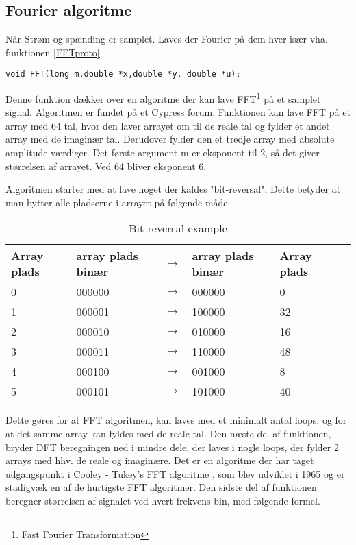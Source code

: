 
\subsection{Fourier algoritme}
Når Strøm og spænding er samplet. Laves der Fourier på dem hver især vha. funktionen \ref{FFTproto}

\begin{lstlisting}
void FFT(long m,double *x,double *y, double *u);
\end{lstlisting}

Denne funktion dækker over en algoritme der kan lave FFT\footnote{Fast Fourier Transformation} på et samplet signal. Algoritmen er fundet på et Cypress forum\cite{FFTalgo}. Funktionen kan lave FFT på et array med 64 tal, hvor den laver arrayet om til de reale tal og fylder et andet array med de imaginær tal. Derudover fylder den et tredje array med absolute amplitude værdiger. Det første argument m er eksponent til 2, så det giver størrelsen af arrayet. Ved 64 bliver eksponent 6.

Algoritmen starter med at lave noget der kaldes "bit-reversal", Dette betyder at man bytter alle pladserne i arrayet på følgende måde:

\begin{table}[H] 
	\centering 
	\begin{tabular}{|l|l|l|l|l|l|} %
		\hline 	%
		Array plads		&array plads binær & $\rightarrow$ 	&array plads binær    	&Array plads 	 \\ \hline 	%
		0		 	& 000000  				& $\rightarrow$ &000000				&0 	 \\ \hline 
		1		 	& 000001  				& $\rightarrow$ &100000				&32	 \\ \hline
		2		 	& 000010  				& $\rightarrow$ &010000				&16	 \\ \hline
		3		 	& 000011  				& $\rightarrow$ &110000				&48	 \\ \hline 
		4		 	& 000100  				& $\rightarrow$ &001000				&8	 \\ \hline 
		5		 	& 000101  				& $\rightarrow$ &101000				&40 \\ \hline   
	\end{tabular} 
	\caption{Bit-reversal example} 
	\label{tab:bit} 
\end{table}
Dette gøres for at FFT algoritmen, kan laves med et minimalt antal loops, og for at det samme array kan fyldes med de reale tal. Den næste del af funktionen, bryder DFT beregningen ned i mindre dele, der laves i nogle loops, der fylder 2 arrays med hhv. de reale og imaginære. Det er en algoritme der har taget udgangspunkt i Cooley - Tukey's FFT algoritme \cite{Cooley}, som blev udviklet i 1965 og er stadigvæk en af de hurtigste FFT algoritmer. Den sidste del af funktionen beregner størrelsen af signalet ved hvert frekvens bin, med følgende formel.



